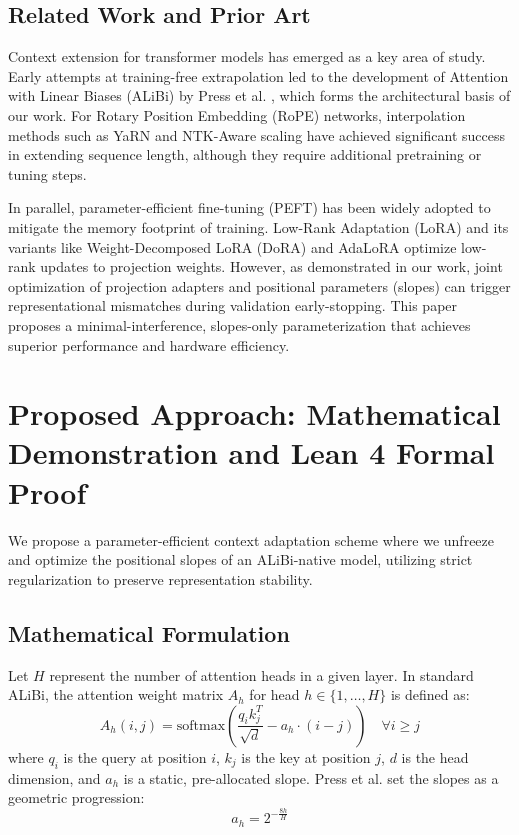 \documentclass[11pt,journal,compsoc]{IEEEtran}
\begin{document}
\subsection{Related Work and Prior Art}
Context extension for transformer models has emerged as a key area of study. Early attempts at training-free extrapolation led to the development of Attention with Linear Biases (ALiBi) by Press et al. \cite{press2022alibi}, which forms the architectural basis of our work. For Rotary Position Embedding (RoPE) networks, interpolation methods such as YaRN \cite{yarn2023} and NTK-Aware scaling \cite{su2023ntk} have achieved significant success in extending sequence length, although they require additional pretraining or tuning steps.

In parallel, parameter-efficient fine-tuning (PEFT) has been widely adopted to mitigate the memory footprint of training. Low-Rank Adaptation (LoRA) \cite{lora2021} and its variants like Weight-Decomposed LoRA (DoRA) \cite{dora2024} and AdaLoRA \cite{adalora2023} optimize low-rank updates to projection weights. However, as demonstrated in our work, joint optimization of projection adapters and positional parameters (slopes) can trigger representational mismatches during validation early-stopping. This paper proposes a minimal-interference, slopes-only parameterization that achieves superior performance and hardware efficiency.




\section{Proposed Approach: Mathematical Demonstration and Lean 4 Formal Proof}
\label{sec:math}

We propose a parameter-efficient context adaptation scheme where we unfreeze and optimize the positional slopes of an ALiBi-native model, utilizing strict regularization to preserve representation stability.

\subsection{Mathematical Formulation}
Let $H$ represent the number of attention heads in a given layer. In standard ALiBi, the attention weight matrix $A_{h}$ for head $h \in \{1, \dots, H\}$ is defined as:
\begin{equation}
    A_{h}(i, j) = \text{softmax} \left( \frac{q_{i} k_{j}^{T}}{\sqrt{d}} - a_{h} \cdot (i - j) \right) \quad \forall i \ge j
\end{equation}
where $q_{i}$ is the query at position $i$, $k_{j}$ is the key at position $j$, $d$ is the head dimension, and $a_{h}$ is a static, pre-allocated slope. Press et al. set the slopes as a geometric progression:
\begin{equation}
    a_{h} = 2^{-\frac{8h}{H}}
\end{equation}
\end{document}
